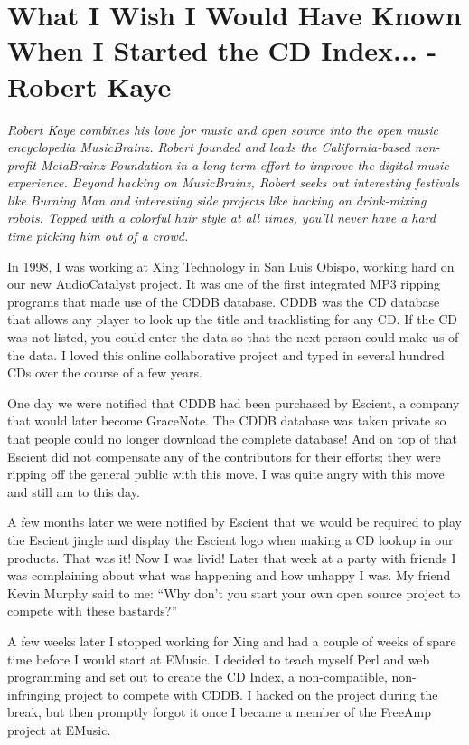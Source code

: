 \chapter{What I Wish I Would Have Known When I Started the CD Index... - Robert
Kaye}

\textit{Robert Kaye combines his love for music and open source into the open
music encyclopedia MusicBrainz. Robert founded and leads the California-based
non-profit MetaBrainz Foundation in a long term effort to improve the digital
music experience. Beyond hacking on MusicBrainz, Robert seeks out interesting
festivals like Burning Man and interesting side projects like hacking on drink-mixing robots. Topped with a colorful hair style at all times, you'll never have a hard time picking him out of a crowd.}

In 1998, I was working at Xing Technology in San Luis Obispo, working hard on
our new AudioCatalyst project. It was one of the first integrated MP3 ripping
programs that made use of the CDDB database. CDDB was the CD database that
allows any player to look up the title and tracklisting for any CD. If the CD
was not listed, you could enter the data so that the next person could make us
of the data. I loved this online collaborative project and typed in several
hundred CDs over the course of a few years.

One day we were notified that CDDB had been purchased by Escient, a company that
would later become GraceNote. The CDDB database was taken private so that people
could no longer download the complete database! And on top of that Escient did
not compensate any of the contributors for their efforts; they were ripping off
the general public with this move. I was quite angry with this move and still am
to this day.

A few months later we were notified by Escient that we would be required to play
the Escient jingle and display the Escient logo when making a CD lookup in our
products. That was it! Now I was livid! Later that week at a party with friends
I was complaining about what was happening and how unhappy I was. My friend
Kevin Murphy said to me: ``Why don’t you start your own open source project to
compete with these bastards?''

A few weeks later I stopped working for Xing and had a couple of weeks of spare
time before I would start at EMusic. I decided to teach myself Perl and web
programming and set out to create the CD Index, a non-compatible, non-infringing
project to compete with CDDB. I hacked on the project during the break, but then
promptly forgot it once I became a member of the FreeAmp project at EMusic.

